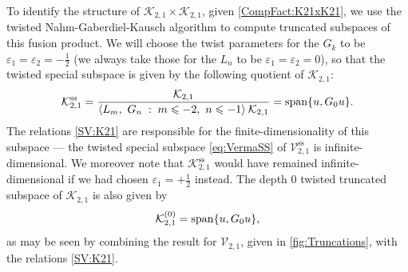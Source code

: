 \documentclass[a4paper,reqno,12pt]{report}
\theoremstyle{definition}
\numberwithin{equation}{section}
\let\originalleft\left     %
\let\originalright\right
\renewcommand{\left}{\mathopen{}\mathclose\bgroup\originalleft}
\renewcommand{\right}{\aftergroup\egroup\originalright}
\newcommand{\set}[1]{\left\{ #1 \right\}}
\newcommand{\st}{\mspace{5mu} : \mspace{5mu}} %
\newcommand{\Ver}[1]{\mathcal{V}_{#1}}       %
\newcommand{\Kac}[1]{\mathcal{K}_{#1}}       %
\newcommand{\spsub}[1]{#1^{\text{ss}}}       %
\newcommand{\fuse}{\mathbin{\times}}                                            %
\newcommand{\NGK}{Nahm-Gaberdiel-Kausch}
\newcommand{\eps}{\varepsilon}
\DeclareMathOperator{\vspn}{span}
\renewcommand{\le}{\leqslant}
\theoremstyle{plain}
\begin{document}
To identify the structure of $\Kac{2,1} \fuse \Kac{2,1}$, given \eqref{CompFact:K21xK21}, we use the twisted \NGK{} algorithm to compute truncated subspaces of this fusion product.  We will choose the twist parameters for the $G_k$ to be $\eps_1 = \eps_2 = -\frac{1}{2}$ (we always take those for the $L_n$ to be $\eps_1 = \eps_2 = 0$), so that the twisted special subspace is given by the following quotient of $\Kac{2,1}$:
\begin{equation} \label{eq:K21SS}
\spsub{\Kac{2,1}} = \frac{\Kac{2,1}}{\left\langle L_m, \ G_n \st m \le -2, \ n \le -1 \right\rangle \: \Kac{2,1}} = \vspn \set{u, G_0 u}.
\end{equation}
The relations \eqref{SV:K21} are responsible for the finite-dimensionality of this subspace --- the twisted special subspace \eqref{eq:VermaSS} of $\spsub{\Ver{2,1}}$ is infinite-dimensional.  We moreover note that $\spsub{\Kac{2,1}}$ would have remained infinite-dimensional if we had chosen $\eps_1 = +\frac{1}{2}$ instead.  The depth $0$ twisted truncated subspace of $\Kac{2,1}$ is also given by
\begin{equation} \label{eq:K21d=0}
\Kac{2,1}^{(0)} = \vspn \set{u, G_0 u},
\end{equation}
as may be seen by combining the result for $\Ver{2,1}$, given in \cref{fig:Truncations}, with the relations \eqref{SV:K21}.
\end{document}
